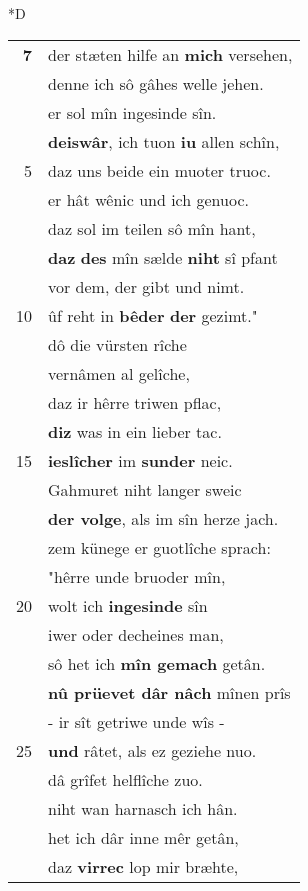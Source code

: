 \documentclass[8pt,a4paper,notitlepage]{article}
\begin{document}
\begin{table}[ht]
\begin{minipage}[t]{0.5\linewidth}
\small
\begin{center}*D
\end{center}
\begin{tabular}{rl}
\textbf{7} & der stæten hilfe an \textbf{mich} versehen,\\ 
 & denne ich sô gâhes welle jehen.\\ 
 & er sol mîn ingesinde sîn.\\ 
 & \textbf{deiswâr}, ich tuon \textbf{iu} allen schîn,\\ 
5 & daz uns beide ein muoter truoc.\\ 
 & er hât wênic und ich genuoc.\\ 
 & daz sol im teilen sô mîn hant,\\ 
 & \textbf{daz} \textbf{des} mîn sælde \textbf{niht} sî pfant\\ 
 & vor dem, der gibt und nimt.\\ 
10 & ûf reht in \textbf{bêder} \textbf{der} gezimt."\\ 
 & dô die vürsten rîche\\ 
 & vernâmen al gelîche,\\ 
 & daz ir hêrre triwen pflac,\\ 
 & \textbf{diz} was in ein lieber tac.\\ 
15 & \textbf{ieslîcher} im \textbf{sunder} neic.\\ 
 & Gahmuret niht langer sweic\\ 
 & \textbf{der volge}, als im sîn herze jach.\\ 
 & zem künege er guotlîche sprach:\\ 
 & "hêrre unde bruoder mîn,\\ 
20 & wolt ich \textbf{ingesinde} sîn\\ 
 & iwer oder decheines man,\\ 
 & sô het ich \textbf{mîn gemach} getân.\\ 
 & \textbf{nû prüevet dâr nâch} mînen prîs\\ 
 & - ir sît getriwe unde wîs -\\ 
25 & \textbf{und} râtet, als ez geziehe nuo.\\ 
 & dâ grîfet helflîche zuo.\\ 
 & niht wan harnasch ich hân.\\ 
 & het ich dâr inne mêr getân,\\ 
 & daz \textbf{virrec} lop mir bræhte,\\ 

\end{tabular}
\end{minipage}
\end{table}
\end{document}
